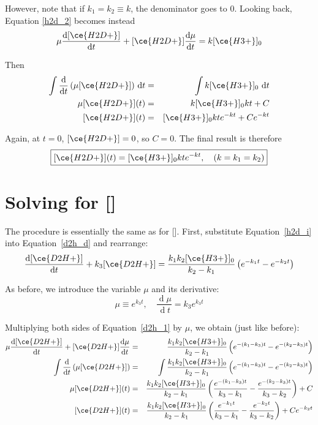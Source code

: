 \documentclass[10pt]{article}
\renewcommand{\d}[1]{\ensuremath{\operatorname{d}\!{#1}}}
\begin{document}
However, note that if $k_1 = k_2 \equiv k$, the denominator goes to 0.
Looking back, Equation \eqref{h2d_2} becomes instead
\begin{equation}
\mu\frac{\d{[\ce{H2D+}]}}{\d{t}} + [\ce{H2D+}]\frac{\d{\mu}}{\d{t}} = k[\ce{H3+}]_0
\end{equation}

Then
\begin{eqnarray}
 \int \frac{\d{}}{\d{t}}\left(\mu[\ce{H2D+}]\right)\,\d{t} & = & \int k[\ce{H3+}]_0 \,\d{t} \nonumber \\
 \mu[\ce{H2D+}](t) & = &k[\ce{H3+}]_0 kt + C \nonumber \\
 {[\ce{H2D+}](t)} & = & [\ce{H3+}]_0 kte^{-k t} + Ce^{-kt}
\end{eqnarray}

Again, at $t=0$, $[\ce{H2D+}] = 0$, so $C=0$.
The final result is therefore
\begin{equation}
 \boxed{[\ce{H2D+}](t) = [\ce{H3+}]_0 kte^{-k t},\quad (k = k_1 = k_2)}
\end{equation}

\section*{Solving for []}

The procedure is essentially the same as for [].
First, substitute Equation~\eqref{h2d_i} into Equation~\eqref{d2h_d} and rearrange:
\begin{equation}
 \frac{\d{[\ce{D2H+}]}}{\d{t}} + k_3[\ce{D2H+}] = \frac{k_1k_2[\ce{H3+}]_0}{k_2 - k_1}\left(e^{-k_1 t} - e^{-k_2 t}\right) \label{d2h_1}
\end{equation}

As before, we introduce the variable $\mu$ and its derivative:
\begin{equation}
 \mu \equiv e^{k_3 t},\quad \frac{\d{\mu}}{\d{t}} = k_3e^{k_3 t}
\end{equation}

Multiplying both sides of Equation~\eqref{d2h_1} by $\mu$, we obtain (just like before):
\begin{eqnarray}
 \mu\frac{\d{[\ce{D2H+}]}}{\d{t}} + [\ce{D2H+}]\frac{\d{\mu}}{\d{t}} & = & \frac{k_1k_2[\ce{H3+}]_0}{k_2 - k_1}\left(e^{-(k_1-k_3) t} - e^{-(k_2-k_3) t}\right) \nonumber \\
 \int \frac{\d{}}{\d{t}}\left(\mu[\ce{D2H+}]\right) & = & \int \frac{k_1k_2[\ce{H3+}]_0}{k_2 - k_1}\left(e^{-(k_1-k_3) t} - e^{-(k_2-k_3) t}\right) \nonumber \\
 \mu[\ce{D2H+}](t) & = & \frac{k_1k_2[\ce{H3+}]_0}{k_2 - k_1}\left(\frac{e^{-(k_1-k_3) t}}{k_3 - k_1} - \frac{e^{-(k_2-k_3) t}}{k_3 - k_2}\right) + C \nonumber \\
 {[\ce{D2H+}](t)} & = & \frac{k_1k_2[\ce{H3+}]_0}{k_2 - k_1}\left(\frac{e^{-k_1 t}}{k_3 - k_1} - \frac{e^{-k_2 t}}{k_3 - k_2}\right) + Ce^{-k_2 t}
\end{eqnarray}
\end{document}
